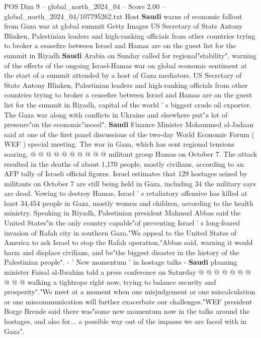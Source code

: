 \begin{textsample}{POS Dim 9 – global\_north\_2024\_04 – Score 2.00 – global\_north\_2024\_04/107795262.txt}  \label{ex:f9_pos_181}
Host \textbf{Saudi} warns of economic fallout from Gaza war at global summit Getty Images US Secretary of State Antony Blinken, Palestinian leaders and high-ranking officials from other countries trying to broker a ceasefire between Israel and Hamas are on the guest list for the summit in Riyadh \textbf{Saudi} Arabia on Sunday called for regional"stability", warning of the effects of the ongoing Israel-Hamas war on global economic sentiment at the start of a summit attended by a host of Gaza mediators.
US Secretary of State Antony Blinken, Palestinian leaders and high-ranking officials from other countries trying to broker a ceasefire between Israel and Hamas are on the guest list for the summit in Riyadh, capital of the world ' s biggest crude oil exporter.
The Gaza war along with conflicts in Ukraine and elsewhere put"a lot of pressure"on the economic"mood", \textbf{Saudi} Finance Minister Mohammed al-Jadaan said at one of the first panel discussions of the two-day World Economic Forum ( WEF ) special meeting.
The war in Gaza, which has sent regional tensions soaring, @ @ @ @ @ @ @ @ @ @ militant group Hamas on October 7.
The attack resulted in the deaths of about 1,170 people, mostly civilians, according to an AFP tally of Israeli official figures.
Israel estimates that 129 hostages seized by militants on October 7 are still being held in Gaza, including 34 the military says are dead.
Vowing to destroy Hamas, Israel ' s retaliatory offensive has killed at least 34,454 people in Gaza, mostly women and children, according to the health ministry.
Speaking in Riyadh, Palestinian president Mahmud Abbas said the United States"is the only country capable"of preventing Israel ' s long-feared invasion of Rafah city in southern Gaza."We appeal to the United States of America to ask Israel to stop the Rafah operation,"Abbas said, warning it would harm and displace civilians, and be"the biggest disaster in the history of the Palestinian people". - ' New momentum ' in hostage talks - \textbf{Saudi} planning minister Faisal al-Ibrahim told a press conference on Saturday @ @ @ @ @ @ @ @ @ @ walking a tightrope right now, trying to balance security and prosperity"."We meet at a moment when one misjudgement or one miscalculation or one miscommunication will further exacerbate our challenges."WEF president Borge Brende said there was"some new momentum now in the talks around the hostages, and also for... a possible way out of the impasse we are faced with in Gaza".

\end{textsample}
